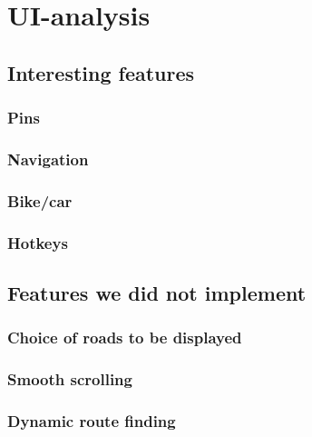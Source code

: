 \chapter{UI-analysis}
\section{Interesting features}
\subsection{Pins}
\subsection{Navigation}
\subsection{Bike/car}
\subsection{Hotkeys}

\section{Features we did not implement}
\subsection{Choice of roads to be displayed}
\subsection{Smooth scrolling}
\subsection{Dynamic route finding}